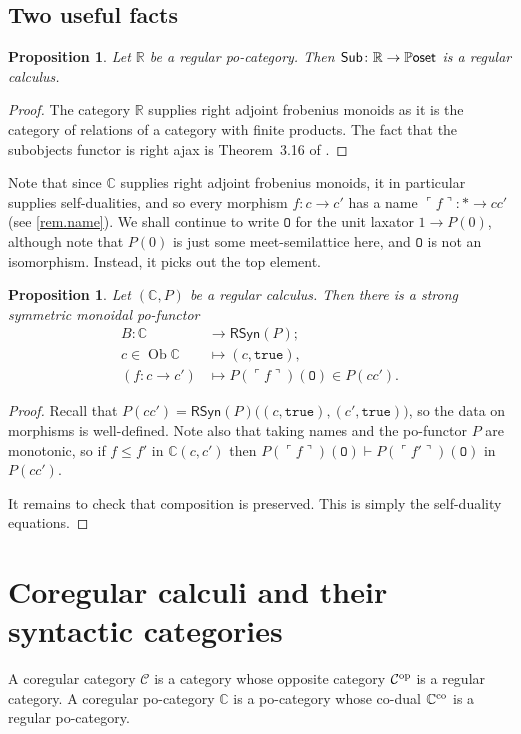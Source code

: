 \documentclass[11pt, oneside, article]{memoir}
\theoremstyle{plain}
\newtheorem{proposition}[theorem]{Proposition}
\theoremstyle{definition}
\theoremstyle{remark}
\newcommand{\Set}[1]{\mathrm{#1}}%
\newcommand{\const}[1]{\mathtt{#1}}%
\newcommand{\cat}[1]{\mathcal{#1}}%
\newcommand{\ccat}[1]{\mathbb{#1}}%
\newcommand{\Cat}[1]{{\mathsf{#1}}}%
\newcommand{\CCat}[1]{\mathbb{\StrLeft{#1}{1}}\Cat{\StrGobbleLeft{#1}{1}}}%
\newcommand{\Funr}[1]{\mathsf{#1}}%
\DeclareMathOperator{\ob}{\Set{Ob}}
\newcommand{\tn}[1]{\textnormal{#1}}
\newcommand{\op}{^{\tn{op}}}
\newcommand{\co}{^{\tn{co}}}
\newcommand{\cc}{\mathbb{C}}
\newcommand{\sub}{\Funr{Sub}}
\newcommand{\rsyn}{\Funr{RSyn}}
\newcommand{\ctosyn}{B} %
\newcommand{\abc}{P} %
\newcommand{\pposet}{\CCat{Poset}}
\newcommand{\zero}{\const{O}}
\newcommand{\true}{\const{true}}
\begin{document}
\subsection{Two useful facts}

\begin{proposition}
  Let $\ccat{R}$ be a regular po-category. Then $\sub\colon \ccat{R} \to \pposet$ is a regular calculus.
\end{proposition}
\begin{proof}
  The category $\ccat{R}$ supplies right adjoint frobenius monoids as it is the category of relations of a category with finite products. The fact that the subobjects functor is right ajax is Theorem~3.16 of \cite{fong2018graphical}.
\end{proof}

	Note that since $\cc$ supplies right adjoint frobenius monoids, it in particular supplies self-dualities, and so every morphism $f\colon c \to c'$ has a name $\ulcorner f \urcorner \colon \ast \to cc'$ (see \cref{rem.name}). We shall continue to write $\zero$ for the unit laxator $1 \to \abc(0)$, although note that $\abc(0)$ is just some meet-semilattice here, and $\zero$ is not an isomorphism. Instead, it picks out the top element.

\begin{proposition}
	Let $(\cc,\abc)$ be a regular calculus. Then there is a strong symmetric monoidal po-functor 
	\begin{align*}
		\ctosyn\colon \cc &\longrightarrow \rsyn(\abc); \\
		c \in \ob\cc &\longmapsto (c,\true), \\
		(f\colon c \to c') &\longmapsto  \abc(\ulcorner f \urcorner)(\zero)\in \abc(cc').
	\end{align*}
\end{proposition}
\begin{proof}
	Recall that $\abc(cc') = \rsyn(\abc)\big((c,\true),(c',\true)\big)$, so the data on morphisms is well-defined. Note also that taking names and the po-functor $\abc$ are monotonic, so if $f \le f'$ in $\cc(c,c')$ then $\abc(\ulcorner f \urcorner)(\zero) \vdash \abc(\ulcorner f' \urcorner)(\zero)$ in $\abc(cc')$.

	It remains to check that composition is preserved. This is simply the self-duality equations.
\end{proof}

\section{Coregular calculi and their syntactic categories}
A coregular category $\cat{C}$ is a category whose opposite category $\cat{C}\op$ is a regular category. A coregular po-category $\cc$ is a po-category whose co-dual $\cc\co$ is a regular po-category.
\end{document}
